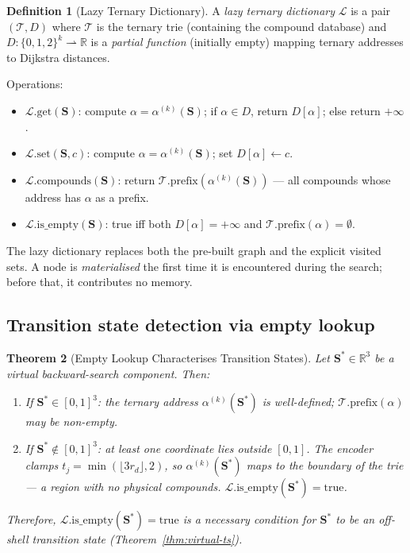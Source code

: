 \documentclass[twocolumn,10pt,a4paper]{article}
\theoremstyle{thmstyle}
\newtheorem{theorem}{Theorem}[section]
\theoremstyle{definition}
\newtheorem{definition}[theorem]{Definition}
\theoremstyle{remark}
\newcommand{\R}{\mathbb{R}}
\newcommand{\Sv}{\mathbf{S}}
\begin{document}
\begin{definition}[Lazy Ternary Dictionary]
\label{def:lazydict}
A \emph{lazy ternary dictionary} $\mathcal{L}$ is a pair
$(\mathcal{T}, D)$ where $\mathcal{T}$ is the ternary trie
(containing the compound database) and
$D: \{0,1,2\}^k \rightharpoonup \mathbb{R}$ is a \emph{partial function}
(initially empty) mapping ternary addresses to Dijkstra distances.

Operations:
\begin{itemize}[nosep]
\item $\mathcal{L}.\text{get}(\Sv)$: compute $\alpha = \alpha^{(k)}(\Sv)$;
  if $\alpha \in D$, return $D[\alpha]$; else return $+\infty$.
\item $\mathcal{L}.\text{set}(\Sv, c)$: compute $\alpha = \alpha^{(k)}(\Sv)$;
  set $D[\alpha] \leftarrow c$.
\item $\mathcal{L}.\text{compounds}(\Sv)$: return $\mathcal{T}.\text{prefix}(\alpha^{(k)}(\Sv))$
  --- all compounds whose address has $\alpha$ as a prefix.
\item $\mathcal{L}.\text{is\_empty}(\Sv)$: true iff both $D[\alpha] = +\infty$
  and $\mathcal{T}.\text{prefix}(\alpha) = \emptyset$.
\end{itemize}
\end{definition}

The lazy dictionary replaces both the pre-built graph and the explicit
visited sets. A node is \emph{materialised} the first time it is
encountered during the search; before that, it contributes no memory.

\subsection{Transition state detection via empty lookup}

\begin{theorem}[Empty Lookup Characterises Transition States]
\label{thm:empty-ts}
Let $\Sv^* \in \R^3$ be a virtual backward-search component. Then:
\begin{enumerate}[nosep,label=(\roman*)]
\item If $\Sv^* \in [0,1]^3$: the ternary address $\alpha^{(k)}(\Sv^*)$
  is well-defined; $\mathcal{T}.\text{prefix}(\alpha)$ may be non-empty.
\item If $\Sv^* \notin [0,1]^3$: at least one coordinate lies outside
  $[0,1]$. The encoder clamps $t_j = \min(\lfloor 3 r_d\rfloor, 2)$,
  so $\alpha^{(k)}(\Sv^*)$ maps to the boundary of the trie — a region
  with no physical compounds. $\mathcal{L}.\text{is\_empty}(\Sv^*) = \text{true}$.
\end{enumerate}
Therefore, $\mathcal{L}.\text{is\_empty}(\Sv^*) = \text{true}$ is a
necessary condition for $\Sv^*$ to be an off-shell transition state
(Theorem~\ref{thm:virtual-ts}).
\end{theorem}
\end{document}
